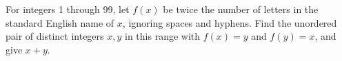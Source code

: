 For integers 1 through 99, let $ f(x)$ be twice the number of letters in the standard English name of $ x $, ignoring spaces and hyphens. Find the unordered pair of distinct integers $ x,y $ in this range with $ f(x)=y $ and $ f(y)=x $, and give $ x+y $.
